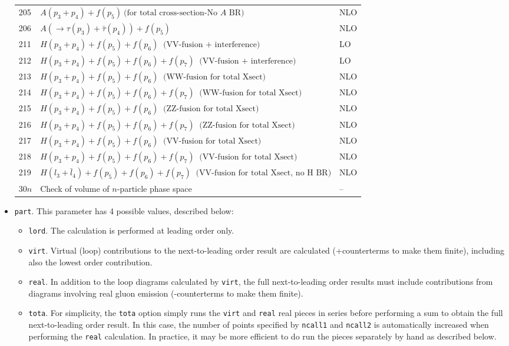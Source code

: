 \documentclass[12pt]{article}
\begin{document}
\begin{itemize}
\begin{table}
\begin{center}
\begin{tabular}{|l|l|l|}
205 &$  A(p_3+p_4) + f(p_5) ~\mbox{(for total cross-section-No $A$ BR)}$&   NLO \\
206 &$  A (\to \tau(p_3) + {\bar \tau}(p_4)) + f(p_5)$&   NLO \\
211 &$  H(p_3+p_4)+f(p_5)+f(p_6) ~\mbox{ (VV-fusion + interference)}$& LO \\
212 &$  H(p_3+p_4)+f(p_5)+f(p_6)+f(p_7) ~\mbox{ (VV-fusion + interference)}$& LO \\
213 &$  H(p_3+p_4)+f(p_5)+f(p_6) ~\mbox{ (WW-fusion for total Xsect)}$& NLO \\
214 &$  H(p_3+p_4)+f(p_5)+f(p_6)+f(p_7) ~\mbox{ (WW-fusion for total Xsect)}$& NLO \\
215 &$  H(p_3+p_4)+f(p_5)+f(p_6) ~\mbox{ (ZZ-fusion for total Xsect)}$& NLO \\   
216 &$  H(p_3+p_4)+f(p_5)+f(p_6)+f(p_7) ~\mbox{ (ZZ-fusion for total Xsect)}$& NLO \\
217 &$  H(p_3+p_4)+f(p_5)+f(p_6) ~\mbox{ (VV-fusion for total Xsect)}$& NLO \\
218 &$  H(p_3+p_4)+f(p_5)+f(p_6)+f(p_7) ~\mbox{ (VV-fusion for total Xsect)}$& NLO \\
219 &$  H(l_3+{\bar l}_4)+f(p_5)+f(p_6)+f(p_7) ~\mbox{ (VV-fusion for total Xsect, no H BR)}$& NLO \\
\hline
30$n$ &  Check of volume of $n$-particle phase space& --  \\
\hline
\end{tabular}
\end{center}
\end{table}


\item {\tt part}.
This parameter has 4 possible values, described below:
\begin{itemize}
\item {\tt lord}.
The calculation is performed at leading order only.
\item {\tt virt}.
Virtual (loop) contributions to the next-to-leading order result are
calculated (+counterterms to make them finite), including also the
lowest order contribution.
\item {\tt real}.
In addition to the loop diagrams calculated by {\tt virt}, the full
next-to-leading order results must include contributions from diagrams
involving real gluon emission (-counterterms to make them finite).
\item {\tt tota}.
For simplicity, the {\tt tota} option simply runs the {\tt virt} and
{\tt real} real pieces in series before performing a sum to obtain
the full next-to-leading order result. In this case, the number of
points specified by {\tt ncall1} and {\tt ncall2} is automatically
increased when performing the {\tt real} calculation. In practice,
it may be more efficient to do run the pieces separately by hand as
described below.
\end{itemize}


\end{itemize}
\end{document}
